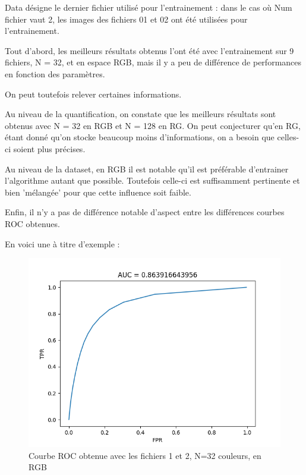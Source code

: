 \documentclass[a4paper,11pt]{article}
\begin{document}
Data désigne le dernier fichier utilisé pour l'entrainement : dans le cas où Num fichier vaut 2, les images des fichiers 01 et 02 ont été utilisées pour l'entrainement.

Tout d'abord, les meilleurs résultats obtenus l'ont été avec l'entrainement sur 9 fichiers, N = 32, et en espace RGB, mais il y a peu de différence de performances en fonction des paramètres.

On peut toutefois relever certaines informations.

Au niveau de la quantification, on constate que les meilleurs résultats sont obtenus avec N = 32 en RGB et N = 128 en RG. On peut conjecturer qu'en RG, étant donné qu'on stocke beaucoup moins d'informations, on a besoin que celles-ci soient plus précises.

Au niveau de la dataset, en RGB il est notable qu'il est préférable d'entrainer l'algorithme autant que possible. Toutefois celle-ci est suffisamment pertinente et bien 'mélangée' pour que cette influence soit faible.

Enfin, il n'y a pas de différence notable d'aspect entre les différences courbes ROC obtenues.

En voici une à titre d'exemple :

\begin{figure}[H]
\begin{center}
    \includegraphics[scale=0.5]{ROC_8_RGB.png}
    \caption{Courbe ROC obtenue avec les fichiers 1 et 2, N=32 couleurs, en RGB}
\end{center}
\end{figure}
\end{document}
